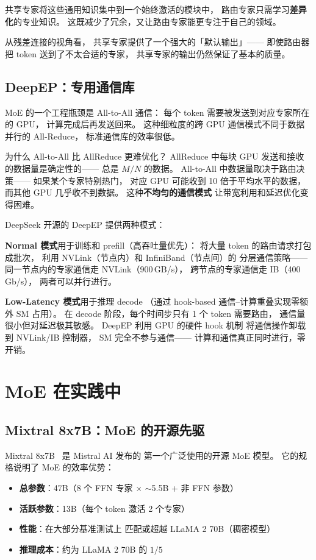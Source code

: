 共享专家将这些通用知识集中到一个始终激活的模块中，
路由专家只需学习\textbf{差异化}的专业知识。
这既减少了冗余，又让路由专家能更专注于自己的领域。

从残差连接的视角看，
共享专家提供了一个强大的「默认输出」——
即使路由器把 token 送到了不太合适的专家，
共享专家的输出仍然保证了基本的质量。

\subsection{DeepEP：专用通信库}

MoE 的一个工程瓶颈是 All-to-All 通信：
每个 token 需要被发送到对应专家所在的 GPU，
计算完成后再发送回来。
这种细粒度的跨 GPU 通信模式不同于数据并行的 All-Reduce，
标准通信库的效率很低。

为什么 All-to-All 比 AllReduce 更难优化？
AllReduce 中每块 GPU 发送和接收的数据量是确定性的——
总是 $M/N$ 的数据。
All-to-All 中数据量取决于路由决策——
如果某个专家特别热门，
对应 GPU 可能收到 10 倍于平均水平的数据，
而其他 GPU 几乎收不到数据。
这种\textbf{不均匀的通信模式}
让带宽利用和延迟优化变得困难。

DeepSeek 开源的 DeepEP 提供两种模式：

\textbf{Normal 模式}用于训练和 prefill（高吞吐量优先）：
将大量 token 的路由请求打包成批次，
利用 NVLink（节点内）和 InfiniBand（节点间）的
分层通信策略——
同一节点内的专家通信走 NVLink（900\,GB/s），
跨节点的专家通信走 IB（400\,Gb/s），
两者可以并行进行。

\textbf{Low-Latency 模式}用于推理 decode
（通过 hook-based 通信--计算重叠实现零额外 SM 占用）。
在 decode 阶段，每个时间步只有 1 个 token 需要路由，
通信量很小但对延迟极其敏感。
DeepEP 利用 GPU 的硬件 hook 机制
将通信操作卸载到 NVLink/IB 控制器，
SM 完全不参与通信——
计算和通信真正同时进行，零开销。

\section{MoE 在实践中}

\subsection{Mixtral 8x7B：MoE 的开源先驱}

Mixtral 8x7B~\cite{jiang2024mixtral} 是 Mistral AI 发布的
第一个广泛使用的开源 MoE 模型。
它的规格说明了 MoE 的效率优势：
\begin{itemize}[noitemsep]
  \item \textbf{总参数}：47B（8 个 FFN 专家 $\times$ $\sim$5.5B + 非 FFN 参数）
  \item \textbf{活跃参数}：13B（每个 token 激活 2 个专家）
  \item \textbf{性能}：在大部分基准测试上
        匹配或超越 LLaMA 2 70B（稠密模型）
  \item \textbf{推理成本}：约为 LLaMA 2 70B 的 $1/5$
\end{itemize}


